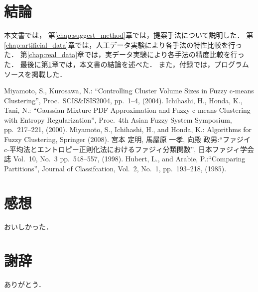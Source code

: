 \documentclass[a4j,12pt,dvipdfmx,oneside]{jsbook}
\theoremstyle{definition}
\begin{document}
 
 
 
\chapter{結論}\label{chap:conclusion}
本文書では，
第\ref{chap:suggest_method}章では，提案手法について説明した．
第\ref{chap:artificial_data}章では，人工データ実験により各手法の特性比較を行った．
第\ref{chap:real_data}章では，実データ実験により各手法の精度比較を行った．
最後に第\ref{chap:conclusion}章では，本文書の結論を述べた．
また，付録では，プログラムソースを掲載した．
%
%
%
%
%
%
\begin{thebibliography}{5}
 Miyamoto, S., Kurosawa, N.: ``Controlling Cluster Volume Sizes in Fuzzy c-means Clustering'', Proc.~SCIS\&ISIS2004, pp.~1--4, (2004).
 Ichihashi, H., Honda, K., Tani, N.: ``Gaussian Mixture PDF Approximation and Fuzzy c-means Clustering with Entropy Regularization'', Proc.~4th Asian Fuzzy System Symposium, pp.~217--221, (2000).
 Miyamoto, S., Ichihashi, H., and Honda, K.: Algorithms for Fuzzy Clustering, Springer (2008).
 宮本 定明, 馬屋原 一孝, 向殿 政男:``ファジイ $c$-平均法とエントロピー正則化法におけるファジィ分類関数'', 日本ファジィ学会誌 Vol.~10, No.~3  pp.~548--557, (1998).
  Hubert, L., and Arabie, P.:``Comparing Partitions'', Journal of Classifcation, Vol.~2, No.~1,
         pp.~193--218, (1985).
\end{thebibliography}
%
\chapter*{感想}
\label{chap:feel}
おいしかった．
\chapter*{謝辞}
\label{chap:ack}
ありがとう．
\appendix
\pagestyle{headings}
\end{document}
